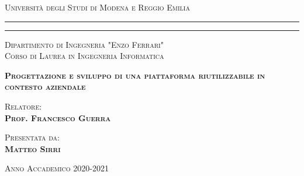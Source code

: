 \textwidth=450pt\oddsidemargin=0pt

\begin{titlepage}
    \begin{center}
        {{\Large{\textsc{Universit\`a degli Studi di Modena e Reggio Emilia}}}} \rule[0.1cm]{15.8cm}{0.1mm}
        \rule[0.5cm]{15.8cm}{0.6mm}
        {\small{\textsc{Dipartimento di Ingegneria "Enzo Ferrari"\\
                    Corso di Laurea in Ingegneria Informatica}}}
    \end{center}
    \vspace{40mm}
    \begin{center}
        \LARGE{\textsc{\textbf{Progettazione e sviluppo di una piattaforma riutilizzabile in contesto aziendale}}}
    \end{center}
    \vspace{40mm}
    \par
    \noindent
    \begin{minipage}[t]{0.47\textwidth}
        {\large{\textsc{Relatore:}}\\
        {\bf \textsc{Prof. Francesco Guerra}}}
    \end{minipage}
    \hfill
    \begin{minipage}[t]{0.47\textwidth}\raggedleft
        {\large{\textsc{Presentata da:}}\\
        {\bf \textsc{Matteo Sirri}}}
    \end{minipage}
    \vspace*{\fill}
    \begin{center}
        {\large{\textsc{Anno Accademico 2020-2021}}}
    \end{center}
\end{titlepage}
